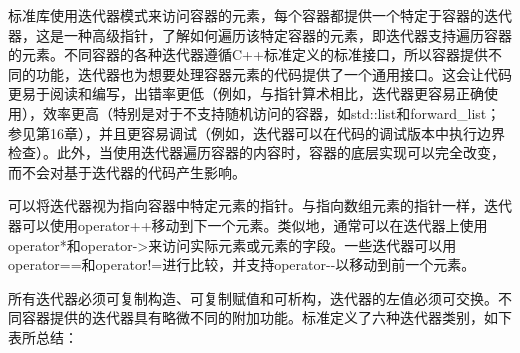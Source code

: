
标准库使用迭代器模式来访问容器的元素，每个容器都提供一个特定于容器的迭代器，这是一种高级指针，了解如何遍历该特定容器的元素，即迭代器支持遍历容器的元素。不同容器的各种迭代器遵循C++标准定义的标准接口，所以容器提供不同的功能，迭代器也为想要处理容器元素的代码提供了一个通用接口。这会让代码更易于阅读和编写，出错率更低（例如，与指针算术相比，迭代器更容易正确使用），效率更高（特别是对于不支持随机访问的容器，如std::list和forward\_list；参见第16章），并且更容易调试（例如，迭代器可以在代码的调试版本中执行边界检查）。此外，当使用迭代器遍历容器的内容时，容器的底层实现可以完全改变，而不会对基于迭代器的代码产生影响。

可以将迭代器视为指向容器中特定元素的指针。与指向数组元素的指针一样，迭代器可以使用operator++移动到下一个元素。类似地，通常可以在迭代器上使用operator*和operator->来访问实际元素或元素的字段。一些迭代器可以用operator==和operator!=进行比较，并支持operator-{}-以移动到前一个元素。

所有迭代器必须可复制构造、可复制赋值和可析构，迭代器的左值必须可交换。不同容器提供的迭代器具有略微不同的附加功能。标准定义了六种迭代器类别，如下表所总结：

